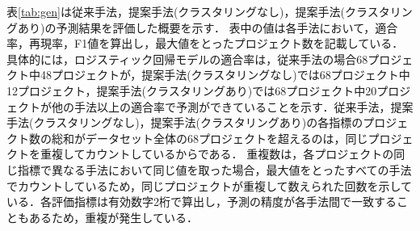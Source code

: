 \documentclass[11pt,dvipdfmx]{jreport}
\begin{document}
\begin{table}{}
    \centering
    \caption{ロジスティック回帰モデルで再現率とF1値が顕著に変化した予測結果}
    \label{tab:log-super}
    \vspace{3mm}
\end{table}


表\ref{tab:gen}は従来手法，提案手法(クラスタリングなし)，提案手法(クラスタリングあり)の予測結果を評価した概要を示す．
表中の値は各手法において，適合率，再現率，F1値を算出し，最大値をとったプロジェクト数を記載している．
具体的には，ロジスティック回帰モデルの適合率は，従来手法の場合68プロジェクト中48プロジェクトが，提案手法(クラスタリングなし)では68プロジェクト中12プロジェクト，提案手法(クラスタリングあり)では68プロジェクト中20プロジェクトが他の手法以上の適合率で予測ができていることを示す．従来手法，提案手法(クラスタリングなし)，提案手法(クラスタリングあり)の各指標のプロジェクト数の総和がデータセット全体の68プロジェクトを超えるのは，同じプロジェクトを重複してカウントしているからである．
重複数は，各プロジェクトの同じ指標で異なる手法において同じ値を取った場合，最大値をとったすべての手法でカウントしているため，同じプロジェクトが重複して数えられた回数を示している．各評価指標は有効数字2桁で算出し，予測の精度が各手法間で一致することもあるため，重複が発生している．
\end{document}
